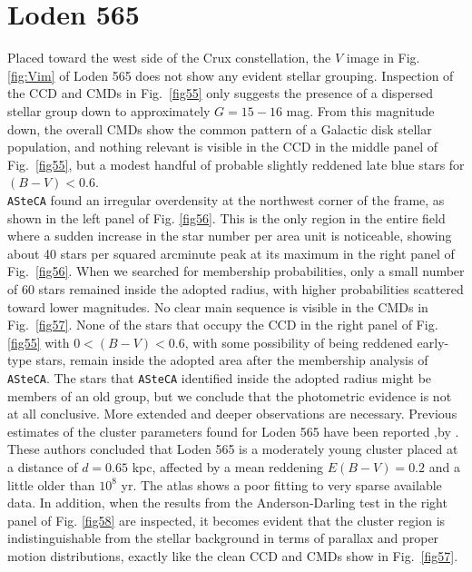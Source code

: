 \documentclass[draft]{aa}
\begin{document}
\section{Loden 565}

Placed toward the west side of the Crux constellation, the $V$ image in Fig. 
\ref{fig:Vim} of Loden 565 does not show any evident stellar grouping. Inspection
of the CCD and CMDs in Fig.~\ref{fig55} only suggests the presence of a
dispersed stellar group down to approximately $G=15-16$ mag. From this magnitude
down, the overall CMDs show the common pattern of a Galactic disk stellar population,
and nothing relevant is visible in the CCD in the middle panel of
Fig.~\ref{fig55}, but a modest handful of probable slightly reddened late blue
stars for $(B-V)<0.6$.\\

\texttt{ASteCA} found an irregular overdensity at the northwest corner of the
frame, as shown in the left panel of Fig. \ref{fig56}. This is the only region in the
entire field where a sudden increase in the star number per area unit is
noticeable, showing about 40 stars per squared arcminute peak at its maximum in
the right panel of Fig.~\ref{fig56}.
%
When we searched for membership probabilities, only a small number of 60 stars
remained inside the adopted radius, with higher probabilities
scattered toward lower magnitudes.
No clear main sequence is visible in the CMDs in Fig.~\ref{fig57}.
None of the stars that
occupy the CCD in the right panel of Fig. \ref{fig55} with $0<(B-V)<0.6$, with some
possibility of being reddened early-type stars, remain inside the adopted area after the membership analysis of 
\texttt{ASteCA}. The stars that \texttt{ASteCA}
identified inside the adopted radius might be members of an old group, but we
conclude that the photometric evidence is not at all conclusive.
%
More extended and deeper observations are necessary. Previous estimates of the
cluster parameters found for Loden 565 have been reported  ,by \cite{Kharchenko_2005}.
These authors concluded that Loden 565 is a moderately young cluster placed at a
distance of $d=0.65$ kpc, affected by a mean reddening $E(B-V)= 0.2$ and
a little older than $10^8$ yr. The \cite{Kharchenko_2005} atlas shows a
poor fitting to very sparse available data. In addition, when the
results from the Anderson-Darling test in the right panel of Fig. \ref{fig58} are inspected,
it becomes evident that the cluster region is indistinguishable from the
stellar background in terms of parallax and proper motion distributions,
exactly like the clean CCD and CMDs show in Fig.~\ref{fig57}.\\
\end{document}

